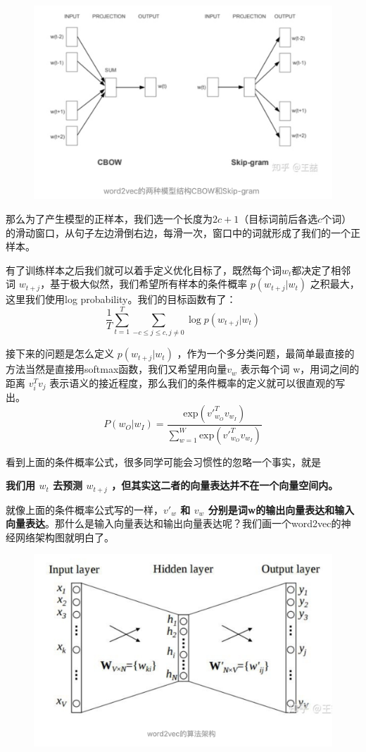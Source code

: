 \documentclass[12pt]{article}
\begin{document}
\begin{figure}[H]
    \centering
    \includegraphics[width=.8\textwidth]{fig/Embedding_Word2vec_Skip-gram_CBOW.png}
\end{figure}

那么为了产生模型的正样本，我们选一个长度为$2c+1$（目标词前后各选$c$个词）的滑动窗口，从句子左边滑倒右边，每滑一次，窗口中的词就形成了我们的一个正样本。

有了训练样本之后我们就可以着手定义优化目标了，既然每个词$w_t$都决定了相邻词 $w_{t+j}$，基于极大似然，我们希望所有样本的条件概率 $p(w_{t+j}|w_t)$ 之积最大，这里我们使用log probability。我们的目标函数有了：
$$
\frac{1}{T} \sum_{t=1}^T\sum_{-c \le j \le c, j \neq 0} \log{p(w_{t+j}|w_t)}
$$

接下来的问题是怎么定义 $p(w_{t+j}|w_t)$ ，作为一个多分类问题，最简单最直接的方法当然是直接用softmax函数，我们又希望用向量$v_w$ 表示每个词 w，用词之间的距离 $v_i^Tv_j$ 表示语义的接近程度，那么我们的条件概率的定义就可以很直观的写出。
$$
P(w_O|w_I) = \frac{\text{exp}({v'}_{w_O}^Tv_{w_I})}{\sum_{w=1}^W\text{exp}({{v'}_{w_O}^Tv_{w_I}})}
$$

看到上面的条件概率公式，很多同学可能会习惯性的忽略一个事实，就是

\textbf{我们用 $w_t$ 去预测 $w_{t+j}$ ，但其实这二者的向量表达并不在一个向量空间内。}

就像上面的条件概率公式写的一样，\textbf{$v'_w$ 和 $v_w$ 分别是词w的输出向量表达和输入向量表达}。那什么是输入向量表达和输出向量表达呢？我们画一个word2vec的神经网络架构图就明白了。
\begin{figure}[H]
    \centering
    \includegraphics[width=.8\textwidth]{fig/Word2Vec_Algorithm_Structure.png}
\end{figure}
\end{document}
